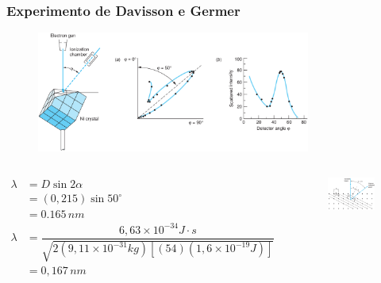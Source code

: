 \documentclass[12pt,brazil]{beamer}
\begin{document}
    

\begin{frame}
\frametitle{Experimento de Davisson e  Germer}

     \vspace*{-0.50cm}
      \begin{figure}
        \includegraphics[width=9cm]{figuras/fig11}
      \end{figure}
      
    \begin{columns}[c]
     
      \column{5cm}
     \vspace*{-0.50cm}
  \fontsize{8pt}{11pt}\selectfont
      \begin{align*}
            \lambda & =  D\sin2\alpha\\
             & =  \left(0,215\right)\sin50^{\circ}\\
            & =  0.165\, nm\\
            \lambda&=\dfrac{6,63\times10^{-34}J\cdot s}{\sqrt{2\left(9,11\times10^{-31}kg\right)\left[\left(54\right)\left(1,6\times10^{-19}J\right)\right]}}\\
            &=0,167\, nm
          \end{align*}
      
      \column{5cm}
     \vspace*{-1.0cm}
      \begin{figure}
        \includegraphics[width=4cm]{figuras/fig12}
      \end{figure}
    \end{columns}

\end{frame}
\end{document}
